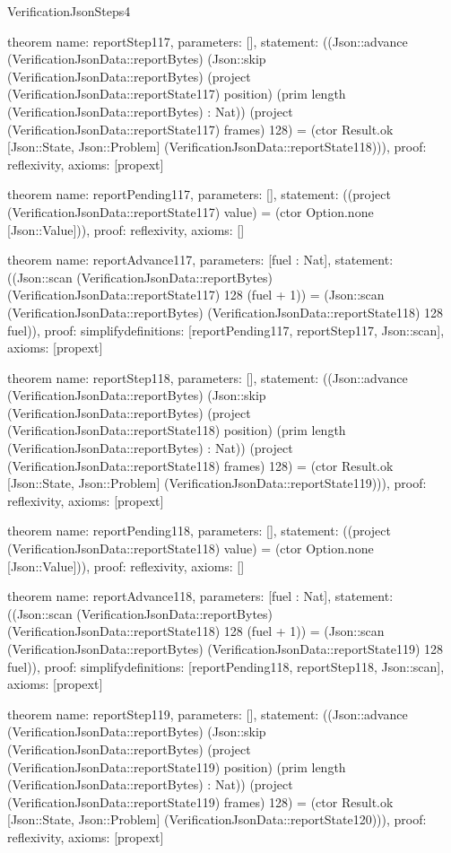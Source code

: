 \begin{lexlean}{VerificationJsonSteps4}
\begin{semanticmodule}
theorem{
  name: reportStep117,
  parameters: [],
  statement: ((Json::advance (VerificationJsonData::reportBytes) (Json::skip (VerificationJsonData::reportBytes) (project (VerificationJsonData::reportState117) position) (prim length (VerificationJsonData::reportBytes) : Nat)) (project (VerificationJsonData::reportState117) frames) 128) = (ctor Result.ok [Json::State, Json::Problem] (VerificationJsonData::reportState118))),
  proof: reflexivity{},
  axioms: [propext]
}

theorem{
  name: reportPending117,
  parameters: [],
  statement: ((project (VerificationJsonData::reportState117) value) = (ctor Option.none [Json::Value])),
  proof: reflexivity{},
  axioms: []
}

theorem{
  name: reportAdvance117,
  parameters: [fuel : Nat],
  statement: ((Json::scan (VerificationJsonData::reportBytes) (VerificationJsonData::reportState117) 128 (fuel + 1)) = (Json::scan (VerificationJsonData::reportBytes) (VerificationJsonData::reportState118) 128 fuel)),
  proof: simplify{definitions: [reportPending117, reportStep117, Json::scan]},
  axioms: [propext]
}

theorem{
  name: reportStep118,
  parameters: [],
  statement: ((Json::advance (VerificationJsonData::reportBytes) (Json::skip (VerificationJsonData::reportBytes) (project (VerificationJsonData::reportState118) position) (prim length (VerificationJsonData::reportBytes) : Nat)) (project (VerificationJsonData::reportState118) frames) 128) = (ctor Result.ok [Json::State, Json::Problem] (VerificationJsonData::reportState119))),
  proof: reflexivity{},
  axioms: [propext]
}

theorem{
  name: reportPending118,
  parameters: [],
  statement: ((project (VerificationJsonData::reportState118) value) = (ctor Option.none [Json::Value])),
  proof: reflexivity{},
  axioms: []
}

theorem{
  name: reportAdvance118,
  parameters: [fuel : Nat],
  statement: ((Json::scan (VerificationJsonData::reportBytes) (VerificationJsonData::reportState118) 128 (fuel + 1)) = (Json::scan (VerificationJsonData::reportBytes) (VerificationJsonData::reportState119) 128 fuel)),
  proof: simplify{definitions: [reportPending118, reportStep118, Json::scan]},
  axioms: [propext]
}

theorem{
  name: reportStep119,
  parameters: [],
  statement: ((Json::advance (VerificationJsonData::reportBytes) (Json::skip (VerificationJsonData::reportBytes) (project (VerificationJsonData::reportState119) position) (prim length (VerificationJsonData::reportBytes) : Nat)) (project (VerificationJsonData::reportState119) frames) 128) = (ctor Result.ok [Json::State, Json::Problem] (VerificationJsonData::reportState120))),
  proof: reflexivity{},
  axioms: [propext]
}


\end{semanticmodule}
\end{lexlean}
